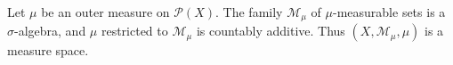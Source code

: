 Let $\mu$ be an outer measure on $\mathcal{P}(X)$. The family $\mathcal{M}_\mu$ of $\mu$-measurable sets is a $\sigma$-algebra, and $\mu$ restricted to $\mathcal{M}_\mu$ is countably additive. Thus $(X, \mathcal{M}_\mu, \mu)$ is a measure space.